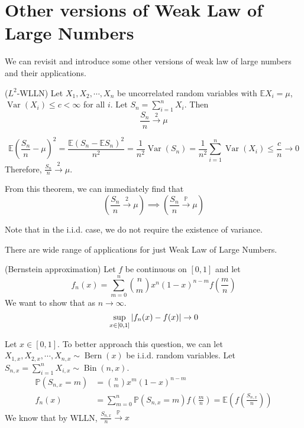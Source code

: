\documentclass{huhtakm-template-book}
\newcommand{\prob}{\mathbb{P}}
\newcommand{\expect}{\mathbb{E}}
\DeclareMathOperator{\Bern}{Bern}
\DeclareMathOperator{\Bin}{Bin}
\DeclareMathOperator{\Var}{Var}
\begin{document}
\section{Other versions of Weak Law of Large Numbers}
We can revisit and introduce some other versions of weak law of large numbers and their applications.
\begin{thm}($L^{2}$-WLLN) 
    Let $X_{1},X_{2},\cdots,X_{n}$ be uncorrelated random variables with $\expect X_{i}=\mu$, $\Var(X_{i})\leq c<\infty$ for all $i$. Let $S_{n}=\sum_{i=1}^{n}X_{i}$. Then
    \begin{equation*}
        \frac{S_{n}}{n}\xrightarrow{2}\mu
    \end{equation*}
\end{thm}
\begin{proofing}
    \begin{equation*}
        \expect\left(\frac{S_{n}}{n}-\mu\right)^{2}=\frac{\expect(S_{n}-\expect S_{n})^{2}}{n^{2}}=\frac{1}{n^{2}}\Var(S_{n})=\frac{1}{n^{2}}\sum_{i=1}^{n}\Var(X_{i})\leq\frac{c}{n}\to 0
    \end{equation*}
    Therefore, $\frac{S_{n}}{n}\xrightarrow{2}\mu$.
\end{proofing}
\begin{rem}
    From this theorem, we can immediately find that
    \begin{equation*}
        \left(\frac{S_{n}}{n}\xrightarrow{2}\mu\right)\implies\left(\frac{S_{n}}{n}\xrightarrow{\prob}\mu\right)
    \end{equation*}
\end{rem}
\begin{rem}
    Note that in the i.i.d. case, we do not require the existence of variance.
\end{rem}
There are wide range of applications for just Weak Law of Large Numbers.
\begin{eg}(Bernstein approximation)
    Let $f$ be continuous on $[0,1]$ and let
    \begin{equation*}
        \tag{Bernstein polynomial}
        f_{n}(x)=\sum_{m=0}^{n}\binom{n}{m}x^{n}(1-x)^{n-m}f\left(\frac{m}{n}\right)
    \end{equation*}
    We want to show that as $n\to\infty$.
    \begin{equation*}
        \sup_{x\in[0,1]}\left|{f_{n}(x)-f(x)}\right|\to 0
    \end{equation*}
\end{eg}
\begin{rem}
    Let $x\in[0,1]$. To better approach this question, we can let $X_{1,x},X_{2,x},\cdots,X_{n,x}\sim\Bern(x)$ be i.i.d. random variables. Let $S_{n,x}=\sum_{i=1}^{n}X_{i,x}\sim\Bin(n,x)$.
    \begin{align*}
        \prob(S_{n,x}=m)&=\binom{n}{m}x^{m}(1-x)^{n-m}\\
        f_{n}(x)&=\sum_{m=0}^{n}\prob(S_{n,x}=m)f\left(\frac{m}{n}\right)=\expect\left(f\left(\frac{S_{n,x}}{n}\right)\right)
    \end{align*}
    We know that by WLLN, $\frac{S_{n,x}}{n}\xrightarrow{\prob}x$
\end{rem}
\end{document}
